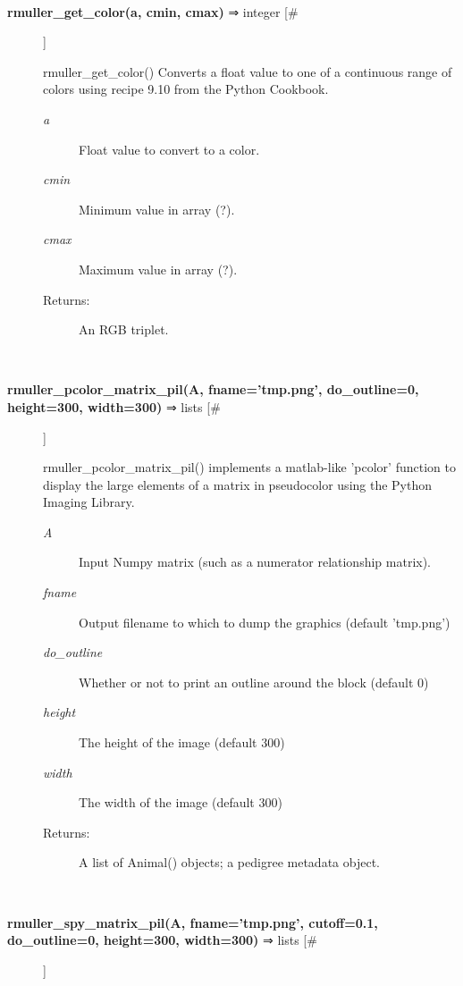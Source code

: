 \documentclass[10pt]{article}
\begin{document}
\begin{description}
\begin{description}
\end{description}
\\ 

\item[\textbf{rmuller\_get\_color(a, cmin, cmax)}
 ⇒ integer [\#]]

 rmuller\_get\_color() Converts a float value to one of a continuous range of colors using recipe 9.10 from the Python Cookbook.
\begin{description}
\item[\emph{a}
] Float value to convert to a color.
\item[\emph{cmin}
] Minimum value in array (?).
\item[\emph{cmax}
] Maximum value in array (?).
\item[Returns:] An RGB triplet.

\end{description}
\\ 

\item[\textbf{rmuller\_pcolor\_matrix\_pil(A, fname='tmp.png', do\_outline=0, height=300, width=300)}
 ⇒ lists [\#]]

 rmuller\_pcolor\_matrix\_pil() implements a matlab-like 'pcolor' function to display the large elements of a matrix in pseudocolor using the Python Imaging Library.
\begin{description}
\item[\emph{A}
] Input Numpy matrix (such as a numerator relationship matrix).
\item[\emph{fname}
] Output filename to which to dump the graphics (default 'tmp.png')
\item[\emph{do\_outline}
] Whether or not to print an outline around the block (default 0)
\item[\emph{height}
] The height of the image (default 300)
\item[\emph{width}
] The width of the image (default 300)
\item[Returns:] A list of Animal() objects; a pedigree metadata object.

\end{description}
\\ 

\item[\textbf{rmuller\_spy\_matrix\_pil(A, fname='tmp.png', cutoff=0.1, do\_outline=0, height=300, width=300)}
 ⇒ lists [\#]]


\end{description}
\end{document}
